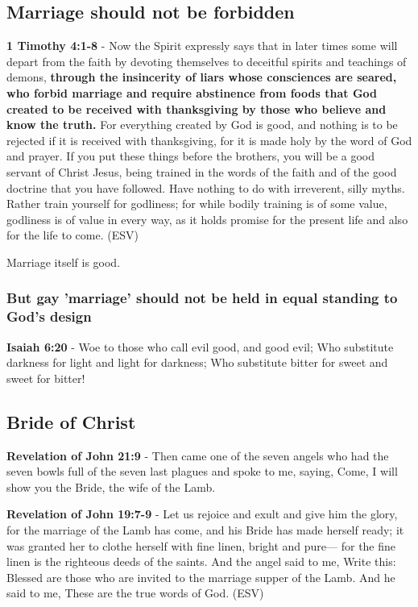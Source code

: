 \documentclass[11pt]{article}
\begin{document}
\subsection{Marriage should not be forbidden}
\label{sec:org02dbc56}
\textbf{1 Timothy 4:1-8} - Now the Spirit expressly says that in later times some will depart from the faith by devoting themselves to deceitful spirits and teachings of demons, \textbf{through the insincerity of liars whose consciences are seared, who forbid marriage and require abstinence from foods that God created to be received with thanksgiving by those who believe and know the truth.} For everything created by God is good, and nothing is to be rejected if it is received with thanksgiving, for it is made holy by the word of God and prayer. If you put these things before the brothers, you will be a good servant of Christ Jesus, being trained in the words of the faith and of the good doctrine that you have followed. Have nothing to do with irreverent, silly myths. Rather train yourself for godliness; for while bodily training is of some value, godliness is of value in every way, as it holds promise for the present life and also for the life to come. (ESV)

Marriage itself is good.

\subsubsection{But gay 'marriage' should not be held in equal standing to God's design}
\label{sec:org3e6c0ea}

\textbf{Isaiah 6:20} - Woe to those who call evil good, and good evil; Who substitute darkness for light and light for darkness; Who substitute bitter for sweet and sweet for bitter!

\subsection{Bride of Christ}
\label{sec:org3319fcb}
\textbf{Revelation of John 21:9} - Then came one of the seven angels who had the seven bowls full of the seven last plagues and spoke to me, saying, Come, I will show you the Bride, the wife of the Lamb.

\textbf{Revelation of John 19:7-9} - Let us rejoice and exult and give him the glory, for the marriage of the Lamb has come, and his Bride has made herself ready; it was granted her to clothe herself with fine linen, bright and pure— for the fine linen is the righteous deeds of the saints. And the angel said to me, Write this: Blessed are those who are invited to the marriage supper of the Lamb. And he said to me, These are the true words of God. (ESV)
\end{document}
